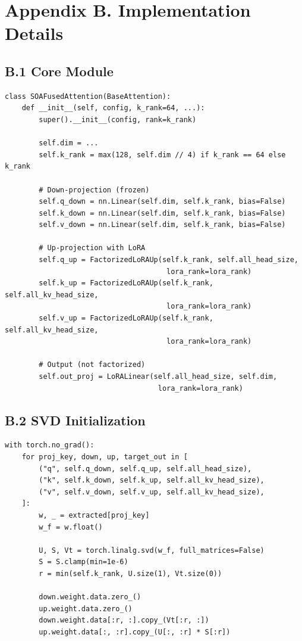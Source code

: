 \section{Appendix B. Implementation Details}

\subsection{B.1 Core Module}

\begin{lstlisting}
class SOAFusedAttention(BaseAttention):
    def __init__(self, config, k_rank=64, ...):
        super().__init__(config, rank=k_rank)
        
        self.dim = ...
        self.k_rank = max(128, self.dim // 4) if k_rank == 64 else k_rank
        
        # Down-projection (frozen)
        self.q_down = nn.Linear(self.dim, self.k_rank, bias=False)
        self.k_down = nn.Linear(self.dim, self.k_rank, bias=False)
        self.v_down = nn.Linear(self.dim, self.k_rank, bias=False)
        
        # Up-projection with LoRA
        self.q_up = FactorizedLoRAUp(self.k_rank, self.all_head_size, 
                                      lora_rank=lora_rank)
        self.k_up = FactorizedLoRAUp(self.k_rank, self.all_kv_head_size, 
                                      lora_rank=lora_rank)
        self.v_up = FactorizedLoRAUp(self.k_rank, self.all_kv_head_size, 
                                      lora_rank=lora_rank)
        
        # Output (not factorized)
        self.out_proj = LoRALinear(self.all_head_size, self.dim, 
                                    lora_rank=lora_rank)
\end{lstlisting}

\subsection{B.2 SVD Initialization}

\begin{lstlisting}
with torch.no_grad():
    for proj_key, down, up, target_out in [
        ("q", self.q_down, self.q_up, self.all_head_size),
        ("k", self.k_down, self.k_up, self.all_kv_head_size),
        ("v", self.v_down, self.v_up, self.all_kv_head_size),
    ]:
        w, _ = extracted[proj_key]
        w_f = w.float()
        
        U, S, Vt = torch.linalg.svd(w_f, full_matrices=False)
        S = S.clamp(min=1e-6)
        r = min(self.k_rank, U.size(1), Vt.size(0))
        
        down.weight.data.zero_()
        up.weight.data.zero_()
        down.weight.data[:r, :].copy_(Vt[:r, :])
        up.weight.data[:, :r].copy_(U[:, :r] * S[:r])
\end{lstlisting}

